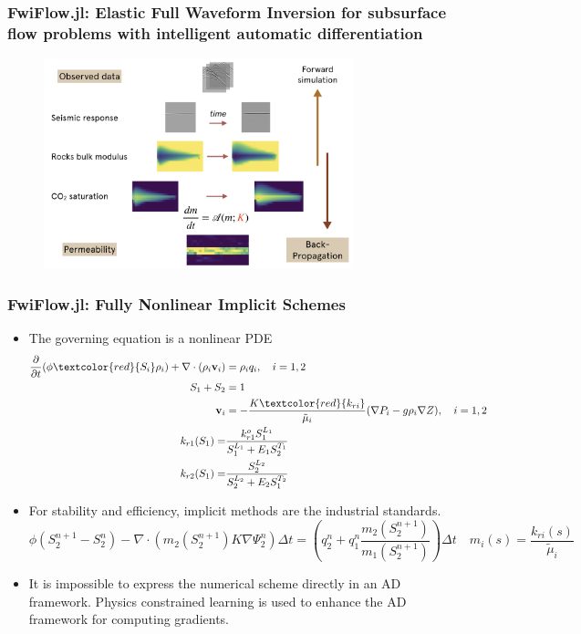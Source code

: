 \documentclass{beamer}
\begin{document}
\begin{frame}
	\frametitle{FwiFlow.jl: Elastic Full Waveform Inversion for subsurface flow problems with intelligent automatic differentiation}
	\begin{figure}[hbt]
  \includegraphics[width=0.8\textwidth]{../geo.png}
\end{figure}
\end{frame}

\begin{frame}
\frametitle{FwiFlow.jl: Fully Nonlinear Implicit Schemes}
\begin{itemize}
	\item The governing equation is a nonlinear PDE
{\scriptsize
	\begin{align*}
	\frac{\partial }{{\partial t}}(\phi {\textcolor{red}{S_i}}{\rho _i}) + \nabla  \cdot ({\rho _i}{\mathbf{v}_i}) &= {\rho _i}{q_i},\quad 
      i = 1,2	\\
      S_{1} + S_{2} &= 1\\
      {\mathbf{v}_i} &= - \frac{{K{\textcolor{red}{k_{ri}}}}}{{{\tilde{\mu}_i}}}(\nabla {P_i} - g{\rho _i}\nabla Z), \quad
      i=1, 2\\
	k_{r1}(S_1) =& \frac{k_{r1}^o S_1^{L_1}}{S_1^{L_1} + E_1 S_2^{T_1}}\\
	k_{r2}(S_1) =& \frac{ S_2^{L_2}}{S_2^{L_2} + E_2 S_1^{T_2}}
	\end{align*}
	}
	\item For stability and efficiency, implicit methods are the industrial standards. 
{\scriptsize	$$\phi (S_2^{n + 1} - S_2^n) - \nabla \cdot \left( {{m_{2}}(S_2^{n + 1})K\nabla \Psi _2^n} \right) \Delta t = 
\left(q_2^n + q_1^n \frac{m_2(S^{n+1}_2)}{m_1(S^{n+1}_2)}\right) 
\Delta t\quad m_i(s) = \frac{k_{ri}(s)}{\tilde \mu_i}
$$}
\item It is impossible to express the numerical scheme directly in an AD framework. Physics constrained learning is used to enhance the AD framework for computing gradients. 
\end{itemize}

\end{frame}
\end{document}
